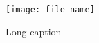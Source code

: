 \begin{figure}[hbtp]
    \begin{center}
        \texttt{[image: file name]}
        \caption[Short caption]
        {Long caption}
        \label{file name}
    \end{center}
\end{figure}